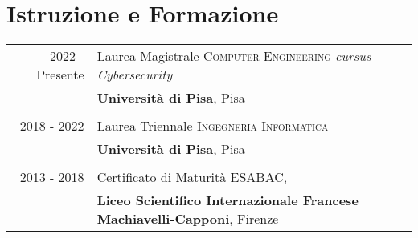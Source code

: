 \documentclass[a4paper,11pt]{article} %
\begin{document}

\section{Istruzione e Formazione}

\begin{tabular}{rl}	



2022 - Presente & Laurea Magistrale \textsc{Computer Engineering} \small\emph{cursus Cybersecurity}\\
& \textbf{Università di Pisa}, Pisa\\
&\\


2018 - 2022 & Laurea Triennale \textsc{Ingegneria Informatica}\\%
&\textbf{Università di Pisa}, Pisa\\
&\\


2013 - 2018 & Certificato di Maturità \textsc{ESABAC},\\
&\textbf{Liceo Scientifico Internazionale Francese Machiavelli-Capponi}, Firenze
\end{tabular}


%
%
\end{document}
